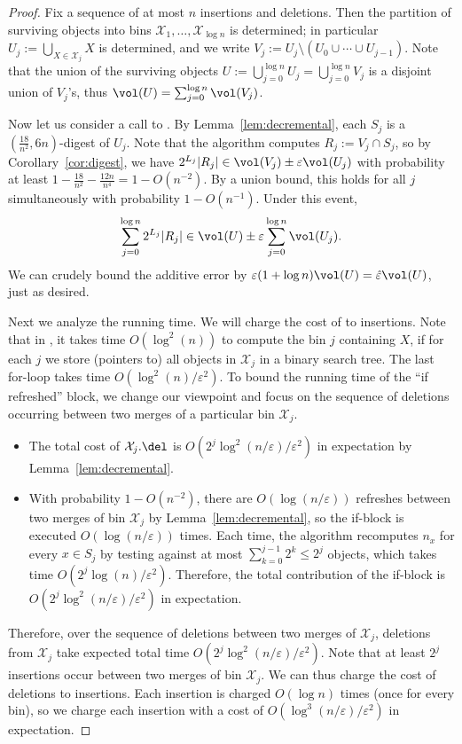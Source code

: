 \documentclass[a4paper, 11pt]{article}
\newcommand{\eps}{\varepsilon}
\newcommand{\class}[1]{\mathcal{#1}}
\begin{document}
\begin{proof}
    Fix a sequence of at most $n$ insertions and deletions. Then the partition of surviving objects into bins $\class{X}_1, \dots, \class{X}_{\log n}$ is determined; in particular $U_j := \bigcup_{X \in \class{X}_j} X$ is determined, and we write $V_j := U_j \setminus (U_0 \cup \cdots \cup U_{j-1})$. Note that the union of the surviving objects $U := \bigcup_{j=0}^{\log n} U_j = \bigcup_{j=0}^{\log n} V_j$ is a disjoint union of $V_j$'s, thus $\vol(U) = \sum_{j=0}^{\log n} \vol(V_j)$.
    
    Now let us consider a call to \est. By Lemma~\ref{lem:decremental}, each $S_j$ is a $(\frac{18}{n^2}, 6n)$-digest of $U_j$. Note that the algorithm computes $R_j := V_j \cap S_j$, so by Corollary~\ref{cor:digest}, we have $2^{L_j} |R_j| \in \vol(V_j) \pm \eps \vol(U_j)$ with probability at least $1 - \frac{18}{n^2} - \frac{12n}{n^4} = 1 - O(n^{-2})$. By a union bound, this holds for all $j$ simultaneously with probability $1 - O(n^{-1})$. Under this event,
    \[ \sum_{j=0}^{\log n} 2^{L_j}|R_j| \in \vol(U) \pm \eps \sum_{j=0}^{\log n} \vol(U_j). \]
    We can crudely bound the additive error by $\eps (1+\log n)\vol(U) = \hat \eps \vol(U)$, just as desired.

    Next we analyze the running time. We will charge the cost of \del to insertions. Note that in \del, it takes time $O(\log^2(n))$ to compute the bin $j$ containing $X$, if for each $j$ we store (pointers to) all objects in $\class{X}_j$ in a binary search tree. The last for-loop takes time $O(\log^2(n) / \eps^2)$. To bound the running time of the ``if refreshed'' block, we change our viewpoint and focus on the sequence of deletions occurring between two merges of a particular bin $\class{X}_j$.
    \begin{itemize}
        \item The total cost of $\class{X}_j.\del$ is $O(2^j \log^2(n/\eps) / \eps^2)$ in expectation by Lemma~\ref{lem:decremental}.  
        \item With probability $1 - O(n^{-2})$, there are $O(\log(n/\eps))$ refreshes between two merges of bin $\class{X}_j$ by Lemma~\ref{lem:decremental}, so the if-block is executed $O(\log(n/\eps))$ times. Each time, the algorithm recomputes $n_x$ for every $x \in S_j$ by testing against at most $\sum_{k = 0}^{j-1} 2^k \leq 2^j$ objects, which takes time $O(2^j \log(n) / \eps^2)$. Therefore, the total contribution of the if-block is $O(2^j \log^2(n/\eps) / \eps^2)$ in expectation.
    \end{itemize}
    Therefore, over the sequence of deletions between two merges of $\class{X}_j$, deletions from $\class{X}_j$ take expected total time $O(2^j \log^2(n/\eps) / \eps^2)$. Note that at least $2^j$ insertions occur between two merges of bin $\class{X}_j$. We can thus charge the cost of deletions to insertions. Each insertion is charged $O(\log n)$ times (once for every bin), so we charge each insertion with a cost of $O(\log^3(n/\eps) / \eps^2)$ in expectation.


\end{proof}
\end{document}
